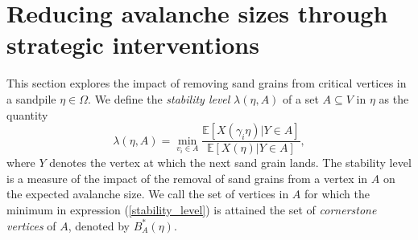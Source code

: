 \documentclass{article}
\begin{document}

\color{black}

\section{Reducing avalanche sizes through strategic interventions}
\label{Reducing avalanche sizes through strategic interventions}


This section explores the impact of removing sand grains from critical vertices in a sandpile $\eta \in \Omega$. We define the \textit{stability level} $\lambda(\eta, A)$ of a set $A \subseteq V$ in $\eta$ as the quantity
\begin{equation}\label{stability_level}
    \lambda(\eta, A) = \min_{v_i \in A}\dfrac{\mathbb{E}[X(\gamma_i \eta)|Y \in A]}{\mathbb{E}[X(\eta)|Y \in A]},
\end{equation} 
where $Y$ denotes the vertex at which the next sand grain lands.
The stability level is a measure of the impact of the removal of sand grains from a vertex in $A$ on the expected avalanche size. We call the set of vertices in $A$ for which the minimum in expression (\ref{stability_level}) is attained the set of \textit{cornerstone vertices} of $A$, denoted by $B^*_A(\eta)$. 
\end{document}
